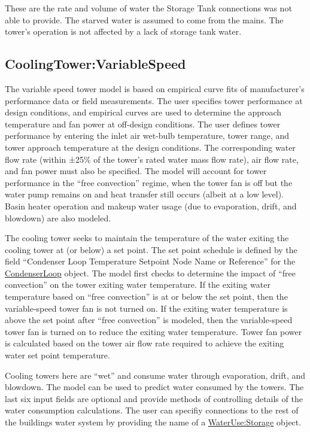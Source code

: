 These are the rate and volume of water the Storage Tank connections was not able to provide. The starved water is assumed to come from the mains. The tower's operation is not affected by a lack of storage tank water.

\subsection{CoolingTower:VariableSpeed}\label{coolingtowervariablespeed}

The variable speed tower model is based on empirical curve fits of manufacturer's performance data or field measurements. The user specifies tower performance at design conditions, and empirical curves are used to determine the approach temperature and fan power at off-design conditions. The user defines tower performance by entering the inlet air wet-bulb temperature, tower range, and tower approach temperature at the design conditions. The corresponding water flow rate (within ±25\% of the tower's rated water mass flow rate), air flow rate, and fan power must also be specified. The model will account for tower performance in the ``free convection'' regime, when the tower fan is off but the water pump remains on and heat transfer still occurs (albeit at a low level). Basin heater operation and makeup water usage (due to evaporation, drift, and blowdown) are also modeled.

The cooling tower seeks to maintain the temperature of the water exiting the cooling tower at (or below) a set point. The set point schedule is defined by the field ``Condenser Loop Temperature Setpoint Node Name or Reference'' for the \hyperref[condenserloop]{CondenserLoop} object. The model first checks to determine the impact of ``free convection'' on the tower exiting water temperature. If the exiting water temperature based on ``free convection'' is at or below the set point, then the variable-speed tower fan is not turned on. If the exiting water temperature is above the set point after ``free convection'' is modeled, then the variable-speed tower fan is turned on to reduce the exiting water temperature. Tower fan power is calculated based on the tower air flow rate required to achieve the exiting water set point temperature.

Cooling towers here are ``wet'' and consume water through evaporation, drift, and blowdown. The model can be used to predict water consumed by the towers. The last six input fields are optional and provide methods of controlling details of the water consumption calculations. The user can specifiy connections to the rest of the buildings water system by providing the name of a \hyperref[waterusestorage]{WaterUse:Storage} object.

